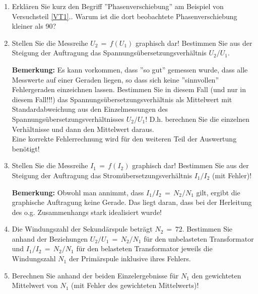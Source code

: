 \begin{enumerate}
%
\item Erklären Sie kurz den Begriff ''Phasenverschiebung'' am Beispiel von Versuchsteil \ref{VT1}.. Warum ist die dort beobachtete Phasenverschiebung kleiner als 90\degree?
%
\item Stellen Sie die Messreihe $U_2\,=\,f(U_1)$ graphisch dar! Bestimmen Sie aus der Steigung der Auftragung das Spannungsübersetzungsverhältnis $U_2/U_1$.

	\noindent
	\textbf{Bemerkung:} Es kann vorkommen, dass ''so gut'' gemessen wurde, dass alle Messwerte auf einer Geraden liegen, so dass sich keine ''sinnvollen'' Fehlergeraden einzeichnen lassen. Bestimmen Sie in diesem Fall (und nur in
	diesem Fall!!!) das Spannungsübersetzungsverhältnis als Mittelwert mit Standardabweichung aus den Einzelmessungen des Spannungsübersetzungsverhältnisses $U_2/U_1$! D.h. berechnen Sie die einzelnen Verhältnisse und dann den Mittelwert daraus. \\
	Eine korrekte Fehlerrechnung wird für den weiteren Teil der Auswertung benötigt!
%
\item Stellen Sie die Messreihe $I_1\,=\,f(I_2)$ graphisch dar! Bestimmen Sie aus der Steigung der Auftragung das Stromübersetzungsverhältnis $I_1/I_2$ (mit Fehler)!

	\noindent
	\textbf{Bemerkung:} Obwohl man annimmt, dass $I_1/I_2\, =\,N_2/N_1$ gilt, ergibt die graphische Auftragung keine Gerade. Das liegt daran, dass bei der Herleitung des o.g. Zusammenhangs stark idealisiert wurde!
%
\item Die Windungszahl der Sekundärspule beträgt $N_2\,=\,72$. Bestimmen Sie anhand der Beziehungen $U_2/U_1\,=\,N_2/N_1$ für den unbelasteten Transformator und $I_1/I_2\,=\,N_2/N_1$ für den belasteten Transformator jeweils die Windungszahl $N_1$ der Primärspule inklusive ihres Fehlers.
%
\item Berechnen Sie anhand der beiden Einzelergebnisse für $N_1$ den gewichteten Mittelwert von $N_1$ (mit Fehler des gewichteten Mittelwerts)!
%
\end{enumerate}